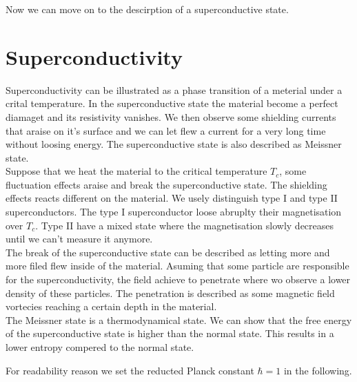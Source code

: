 \documentclass[../main.tex]{subfile}
\begin{document}
Now we can move on to the descirption of a superconductive state.\\
\section{Superconductivity}
Superconductivity can be illustrated as a phase transition of a meterial under a crital temperature. In the superconductive state the material 
become a perfect diamaget and its resistivity vanishes. We then observe some shielding currents that araise on it's surface
and we can let flew a current for a very long time without loosing energy. The superconductive state is also described as Meissner state.\\ 

Suppose that we heat the material to the critical temperature $T_c$, some fluctuation effects araise and break the superconductive state.
The shielding effects reacts different on the material. We usely distinguish type I and type II superconductors. The type I superconductor
loose abruplty their magnetisation over $T_c$. Type II have a mixed state where the magnetisation slowly decreases until we can't measure it anymore.\\

The break of the superconductive state can be described as letting more and more filed 
flew inside of the material. Asuming that some particle are responsible for the superconductivity, the field achieve to penetrate where wo observe 
a lower density of these particles. The penetration is described as some magnetic field vortecies reaching a certain depth in the material.\\

The Meissner state is a thermodynamical state. We can show that the free energy of the superconductive state is higher than the normal state. 
This results in a lower entropy compered to the normal state.

For readability reason we set the reducted Planck constant $\hbar = 1$ in the following.\\
\end{document}
